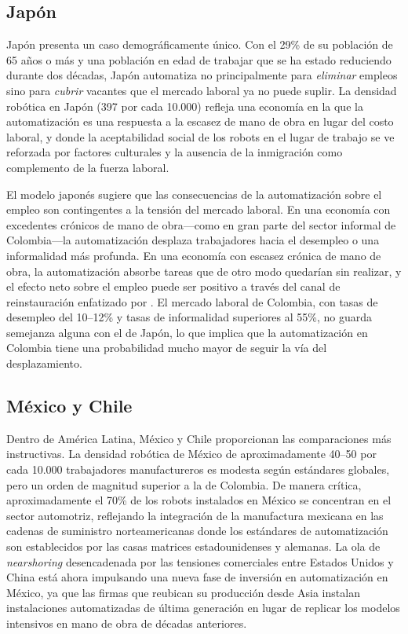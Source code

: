 \documentclass{article}
\begin{document}
\subsection{Jap\'on}
\label{subsec:japan}

Jap\'on presenta un caso demogr\'aficamente \'unico. Con el 29\% de su poblaci\'on de 65 a\~nos o m\'as y una poblaci\'on en edad de trabajar que se ha estado reduciendo durante dos d\'ecadas, Jap\'on automatiza no principalmente para \textit{eliminar} empleos sino para \textit{cubrir} vacantes que el mercado laboral ya no puede suplir. La densidad rob\'otica en Jap\'on (397 por cada 10.000) refleja una econom\'ia en la que la automatizaci\'on es una respuesta a la escasez de mano de obra en lugar del costo laboral, y donde la aceptabilidad social de los robots en el lugar de trabajo se ve reforzada por factores culturales y la ausencia de la inmigraci\'on como complemento de la fuerza laboral.

El modelo japon\'es sugiere que las consecuencias de la automatizaci\'on sobre el empleo son contingentes a la tensi\'on del mercado laboral. En una econom\'ia con excedentes cr\'onicos de mano de obra---como en gran parte del sector informal de Colombia---la automatizaci\'on desplaza trabajadores hacia el desempleo o una informalidad m\'as profunda. En una econom\'ia con escasez cr\'onica de mano de obra, la automatizaci\'on absorbe tareas que de otro modo quedar\'ian sin realizar, y el efecto neto sobre el empleo puede ser positivo a trav\'es del canal de reinstauraci\'on enfatizado por \cite{acemoglu2019automation}. El mercado laboral de Colombia, con tasas de desempleo del 10--12\% y tasas de informalidad superiores al 55\%, no guarda semejanza alguna con el de Jap\'on, lo que implica que la automatizaci\'on en Colombia tiene una probabilidad mucho mayor de seguir la v\'ia del desplazamiento.

\subsection{M\'exico y Chile}
\label{subsec:mexico_chile}

Dentro de Am\'erica Latina, M\'exico y Chile proporcionan las comparaciones m\'as instructivas. La densidad rob\'otica de M\'exico de aproximadamente 40--50 por cada 10.000 trabajadores manufactureros es modesta seg\'un est\'andares globales, pero un orden de magnitud superior a la de Colombia. De manera cr\'itica, aproximadamente el 70\% de los robots instalados en M\'exico se concentran en el sector automotriz, reflejando la integraci\'on de la manufactura mexicana en las cadenas de suministro norteamericanas donde los est\'andares de automatizaci\'on son establecidos por las casas matrices estadounidenses y alemanas. La ola de \textit{nearshoring} desencadenada por las tensiones comerciales entre Estados Unidos y China est\'a ahora impulsando una nueva fase de inversi\'on en automatizaci\'on en M\'exico, ya que las firmas que reubican su producci\'on desde Asia instalan instalaciones automatizadas de \'ultima generaci\'on en lugar de replicar los modelos intensivos en mano de obra de d\'ecadas anteriores.
\end{document}
